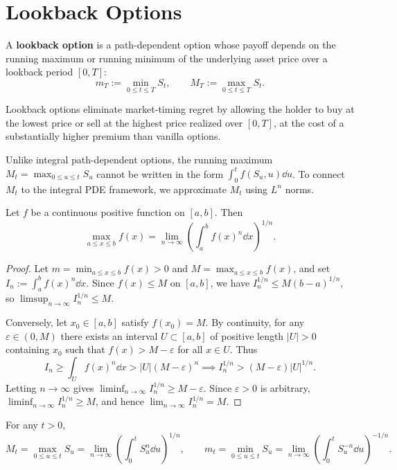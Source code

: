 \section{Lookback Options}

\begin{definition}\label{def:lookback-option}
    A \textbf{lookback option} is a path-dependent option whose payoff depends on the running maximum or running minimum of the underlying asset price over a lookback period $[0, T]$:
    \[
    m_T := \min_{0 \le t \le T} S_t, \qquad M_T := \max_{0 \le t \le T} S_t.
    \]
\end{definition}

Lookback options eliminate market-timing regret by allowing the holder to buy at the lowest price or sell at the highest price realized over $[0, T]$, at the cost of a substantially higher premium than vanilla options.

Unlike integral path-dependent options, the running maximum $M_t = \max_{0 \le u \le t} S_u$ cannot be written in the form $\int_0^t f(S_u, u)\dd u$. To connect $M_t$ to the integral PDE framework, we approximate $M_t$ using $L^n$ norms.

\begin{theorem}\label{thm:lp-norm-max}
    Let $f$ be a continuous positive function on $[a, b]$. Then
    \[
    \max_{a \le x \le b} f(x) = \lim_{n \to \infty}\left(\int_a^b f(x)^n \dd x\right)^{1/n}.
    \]
\end{theorem}
\begin{proof}
    Let $m = \min_{a \le x \le b} f(x) > 0$ and $M = \max_{a \le x \le b} f(x)$, and set $I_n := \int_a^b f(x)^n \dd x$. Since $f(x) \le M$ on $[a, b]$, we have $I_n^{1/n} \le M(b - a)^{1/n}$, so $\limsup_{n \to \infty} I_n^{1/n} \le M$.

    Conversely, let $x_0 \in [a, b]$ satisfy $f(x_0) = M$. By continuity, for any $\varepsilon \in (0, M)$ there exists an interval $U \subset [a, b]$ of positive length $|U| > 0$ containing $x_0$ such that $f(x) > M - \varepsilon$ for all $x \in U$. Thus
    \[
    I_n \ge \int_U f(x)^n \dd x > |U|(M - \varepsilon)^n \implies I_n^{1/n} > (M - \varepsilon)|U|^{1/n}.
    \]
    Letting $n \to \infty$ gives $\liminf_{n \to \infty} I_n^{1/n} \ge M - \varepsilon$. Since $\varepsilon > 0$ is arbitrary, $\liminf_{n \to \infty} I_n^{1/n} \ge M$, and hence $\lim_{n \to \infty} I_n^{1/n} = M$.
\end{proof}

\begin{corollary}\label{cor:lookback-ln}
    For any $t > 0$,
    \[
    M_t = \max_{0 \le u \le t} S_u = \lim_{n \to \infty}\left(\int_0^t S_u^n \dd u\right)^{1/n}, \qquad m_t = \min_{0 \le u \le t} S_u = \lim_{n \to \infty}\left(\int_0^t S_u^{-n} \dd u\right)^{-1/n}.
    \]
\end{corollary}

